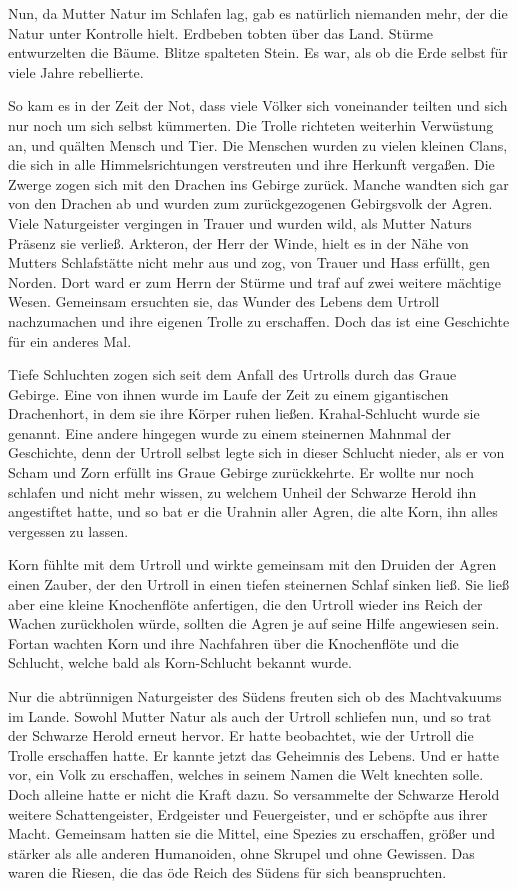 Nun, da Mutter Natur im Schlafen lag, gab es natürlich niemanden mehr, der die Natur unter Kontrolle hielt. Erdbeben tobten über das Land. Stürme entwurzelten die Bäume. Blitze spalteten Stein. Es war, als ob die Erde selbst für viele Jahre rebellierte.

So kam es in der Zeit der Not, dass viele Völker sich voneinander teilten und sich nur noch um sich selbst kümmerten. Die Trolle richteten weiterhin Verwüstung an, und quälten Mensch und Tier. Die Menschen wurden zu vielen kleinen Clans, die sich in alle Himmelsrichtungen verstreuten und ihre Herkunft vergaßen. Die Zwerge zogen sich mit den Drachen ins Gebirge zurück. Manche wandten sich gar von den Drachen ab und wurden zum zurückgezogenen Gebirgsvolk der Agren. Viele Naturgeister vergingen in Trauer und wurden wild, als Mutter Naturs Präsenz sie verließ. Arkteron, der Herr der Winde, hielt es in der Nähe von Mutters Schlafstätte nicht mehr aus und zog, von Trauer und Hass erfüllt, gen Norden. Dort ward er zum Herrn der Stürme und traf auf zwei weitere mächtige Wesen. Gemeinsam ersuchten sie, das Wunder des Lebens dem Urtroll nachzumachen und ihre eigenen Trolle zu erschaffen. Doch das ist eine Geschichte für ein anderes Mal.

Tiefe Schluchten zogen sich seit dem Anfall des Urtrolls durch das Graue Gebirge. Eine von ihnen wurde im Laufe der Zeit zu einem gigantischen Drachenhort, in dem sie ihre Körper ruhen ließen. Krahal-Schlucht wurde sie genannt. Eine andere hingegen wurde zu einem steinernen Mahnmal der Geschichte, denn der Urtroll selbst legte sich in dieser Schlucht nieder, als er von Scham und Zorn erfüllt ins Graue Gebirge zurückkehrte. Er wollte nur noch schlafen und nicht mehr wissen, zu welchem Unheil der Schwarze Herold ihn angestiftet hatte, und so bat er die Urahnin aller Agren, die alte Korn, ihn alles vergessen zu lassen.

Korn fühlte mit dem Urtroll und wirkte gemeinsam mit den Druiden der Agren einen Zauber, der den Urtroll in einen tiefen steinernen Schlaf sinken ließ. Sie ließ aber eine kleine Knochenflöte anfertigen, die den Urtroll wieder ins Reich der Wachen zurückholen würde, sollten die Agren je auf seine Hilfe angewiesen sein. Fortan wachten Korn und ihre Nachfahren über die Knochenflöte und die Schlucht, welche bald als Korn-Schlucht bekannt wurde.

Nur die abtrünnigen Naturgeister des Südens freuten sich ob des Machtvakuums im Lande. Sowohl Mutter Natur als auch der Urtroll schliefen nun, und so trat der Schwarze Herold erneut hervor. Er hatte beobachtet, wie der Urtroll die Trolle erschaffen hatte. Er kannte jetzt das Geheimnis des Lebens. Und er hatte vor, ein Volk zu erschaffen, welches in seinem Namen die Welt knechten solle. Doch alleine hatte er nicht die Kraft dazu. So versammelte der Schwarze Herold weitere Schattengeister, Erdgeister und Feuergeister, und er schöpfte aus ihrer Macht. Gemeinsam hatten sie die Mittel, eine Spezies zu erschaffen, größer und stärker als alle anderen Humanoiden, ohne Skrupel und ohne Gewissen. Das waren die Riesen, die das öde Reich des Südens für sich beanspruchten.

